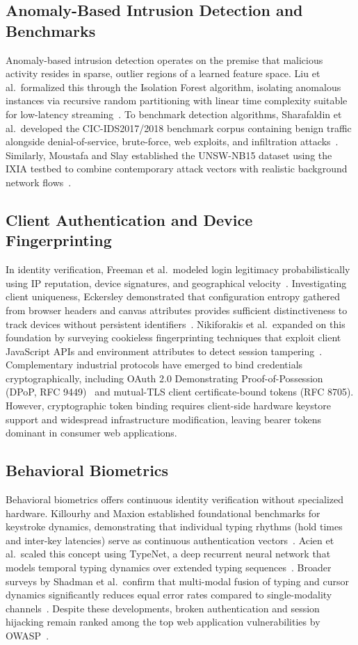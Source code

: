 \documentclass[conference]{IEEEtran}
\begin{document}
\subsection{Anomaly-Based Intrusion Detection and Benchmarks}
Anomaly-based intrusion detection operates on the premise that malicious activity resides in sparse, outlier regions of a learned feature space. Liu et al.\ formalized this through the Isolation Forest algorithm, isolating anomalous instances via recursive random partitioning with linear time complexity suitable for low-latency streaming~\cite{ref3}. To benchmark detection algorithms, Sharafaldin et al.\ developed the CIC-IDS2017/2018 benchmark corpus containing benign traffic alongside denial-of-service, brute-force, web exploits, and infiltration attacks~\cite{ref4}. Similarly, Moustafa and Slay established the UNSW-NB15 dataset using the IXIA testbed to combine contemporary attack vectors with realistic background network flows~\cite{ref5}.

\subsection{Client Authentication and Device Fingerprinting}
In identity verification, Freeman et al.\ modeled login legitimacy probabilistically using IP reputation, device signatures, and geographical velocity~\cite{ref6}. Investigating client uniqueness, Eckersley demonstrated that configuration entropy gathered from browser headers and canvas attributes provides sufficient distinctiveness to track devices without persistent identifiers~\cite{ref7}. Nikiforakis et al.\ expanded on this foundation by surveying cookieless fingerprinting techniques that exploit client JavaScript APIs and environment attributes to detect session tampering~\cite{ref8}. Complementary industrial protocols have emerged to bind credentials cryptographically, including OAuth 2.0 Demonstrating Proof-of-Possession (DPoP, RFC 9449)~\cite{ref14} and mutual-TLS client certificate-bound tokens (RFC 8705). However, cryptographic token binding requires client-side hardware keystore support and widespread infrastructure modification, leaving bearer tokens dominant in consumer web applications.

\subsection{Behavioral Biometrics}
Behavioral biometrics offers continuous identity verification without specialized hardware. Killourhy and Maxion established foundational benchmarks for keystroke dynamics, demonstrating that individual typing rhythms (hold times and inter-key latencies) serve as continuous authentication vectors~\cite{ref9,ref11}. Acien et al.\ scaled this concept using TypeNet, a deep recurrent neural network that models temporal typing dynamics over extended typing sequences~\cite{ref10}. Broader surveys by Shadman et al.\ confirm that multi-modal fusion of typing and cursor dynamics significantly reduces equal error rates compared to single-modality channels~\cite{ref12}. Despite these developments, broken authentication and session hijacking remain ranked among the top web application vulnerabilities by OWASP~\cite{ref2,ref15}.
\end{document}
